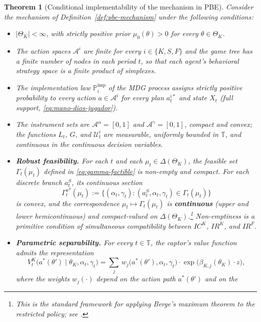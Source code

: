 \documentclass[12pt,a4paper]{article}
\providecommand{\textcite}{\citet}
\theoremstyle{plain}
\newtheorem{theorem}{Theorem}[section]
\theoremstyle{definition}
\theoremstyle{remark}
\newcommand{\ProbI}[1]{\mathbb{P}_{#1}^{\mathrm{imp}}}
\newcommand{\1}{\mathbf{1}}
\begin{document}
\begin{theorem}[Conditional implementability of the mechanism in PBE]
\label{thm:ebp-implementabilidad}
Consider the mechanism of Definition~\ref{def:pbe-mechanism} under the following
conditions:
\begin{itemize}
  \item[\textup{(i)}] $|\Theta_K|<\infty$, with strictly positive prior
  $\mu_0(\theta)>0$ for every $\theta\in\Theta_K$.
  \item[\textup{(ii)}] The action spaces $\mathcal{A}^i$ are finite for every
  $i\in\{K,S,F\}$ and the game tree has a finite number of nodes in each period $t$, so
  that each agent's behavioral strategy space is a finite product of simplexes.
  \item[\textup{(iii)}] The implementation law $\ProbI{i}$ of the MDG process assigns
  strictly positive probability to every action $a\in\mathcal{A}^i$ for every plan
  $a_t^{i\ast}$ and state $X_t$ \textup{(full support, \eqref{eq:mano-dios-jugador})}.
  \item[\textup{(iv)}] The instrument sets are $\mathcal{A}^{\alpha}=[0,1]$ and
  $\mathcal{A}^{\gamma}=[0,1]$, compact and convex; the functions $L_t$, $G$, and
  $\mathcal{U}_t^i$ are measurable, uniformly bounded in $\mathbb{T}$, and continuous
  in the continuous decision variables.
  \item[\textup{(v)}] \textbf{Robust feasibility.} For each $t$ and each
  $\mu_t\in\Delta(\Theta_K)$, the feasible set $\Gamma_t(\mu_t)$ defined in
  \eqref{eq:gamma-factible} is non-empty and compact. For each discrete branch
  $a_t^S$, its continuous section
  \[
  \Gamma_t^{a^S}(\mu_t):=\{(\alpha_t,\gamma_t):(a_t^S,\alpha_t,\gamma_t)\in\Gamma_t(\mu_t)\}
  \]
  is convex, and the correspondence $\mu_t\mapsto\Gamma_t(\mu_t)$ is
  \textbf{continuous} \textup{(upper and lower hemicontinuous)} and compact-valued on
  $\Delta(\Theta_K)$.\footnote{This is the standard framework for applying Berge's
  maximum theorem to the restricted policy; see \textcite{AliprantisBorder2006}.}
  Non-emptiness is a primitive condition of simultaneous compatibility between
  $IC^K$, $IR^K$, and $IR^F$.
  \item[\textup{(vi)}] \textbf{Parametric separability.} For every $t\in\mathbb{T}$,
  the captor's value function admits the representation
  \[
    V^K_t\!\bigl(a^\ast(\theta')\mid\theta_K,\alpha_t,\gamma_t\bigr)
    =
    \sum_{j}\,w_j\!\bigl(a^\ast(\theta'),\alpha_t,\gamma_t\bigr)
    \cdot\exp\!\bigl(\beta_{K,j}(\theta_K)\cdot z\bigr),
  \]
  where the weights $w_j(\cdot)$ depend on the action path $a^\ast(\theta')$ and on the

\end{itemize}
\end{theorem}
\end{document}
